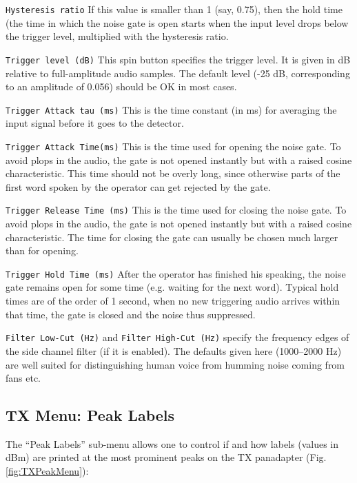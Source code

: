 \documentclass[12pt]{book}
\def\rett#1{\texttt{\color{red}#1}}
\begin{document}
\rett{Hysteresis ratio} If this  value is smaller than 1 (say, 0.75), then the hold time (the time in which the noise
gate is open starts when the input level drops below the trigger level, multiplied with the hysteresis ratio.

\rett{Trigger level (dB)} This spin button specifies the trigger level. It is given in dB relative to
full-amplitude audio samples. The default level (-25 dB, corresponding to an amplitude of 0.056) should
be OK in most cases.

\rett{Trigger Attack tau (ms)} This is the time constant (in ms) for averaging the input signal before
it goes to the detector.

\rett{Trigger Attack Time(ms)} This is the time used for opening the noise gate. To avoid plops in the
audio, the gate is not opened instantly but with a raised cosine characteristic. This time should not
be overly long, since otherwise parts of the first word spoken by the operator can get rejected by
the gate.

\rett{Trigger Release Time (ms)} This is the time used for closing the noise  gate. To avoid plops in the
audio, the gate is not opened instantly but with a raised cosine characteristic. The time for closing the
gate can usually be chosen much larger than for  opening.

\rett{Trigger Hold Time (ms)} After the operator has finished his speaking, the noise gate remains open
for some time (e.g. waiting for the next word). Typical hold times are of the order of 1 second, when no
new triggering audio arrives within that time, the gate is closed and the noise  thus suppressed.

\rett{Filter Low-Cut (Hz)} and \rett{Filter  High-Cut (Hz)} specify the frequency edges of the side
channel filter (if it is enabled). The defaults given here (1000--2000 Hz) are well suited  for distinguishing
human voice from humming noise coming from fans etc.



\subsection{TX Menu: Peak Labels}

The ``Peak Labels'' sub-menu allows one to control if and how labels
(values in dBm) are printed at the most prominent peaks on the
TX panadapter (Fig. \ref{fig:TXPeakMenu}):
\end{document}
